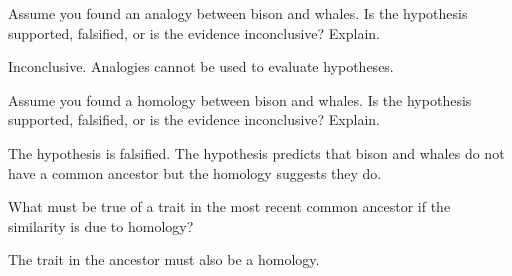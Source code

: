\documentclass[12pt, addpoints, hidelinks]{exam}
\newcommand*\AnswerBox[2]{%
    \parbox[t][#1]{0.92\textwidth}{%
    \begin{solution}#2\end{solution}}
}
\begin{document}
\begin{questions}
\question[1]
Assume you found an analogy between bison and whales. Is the hypothesis supported, falsified, or is the evidence inconclusive? Explain.

\AnswerBox{4\baselineskip}{Inconclusive. Analogies cannot be used to evaluate hypotheses.}

\question[1]
Assume you found a homology between bison and whales. Is the hypothesis supported, falsified, or is the evidence inconclusive? Explain.

\AnswerBox{4\baselineskip}{The hypothesis is falsified. The hypothesis predicts that bison and whales do not have a common ancestor but the homology suggests they do.}

\question[1]
What must be true of a trait in the most recent common ancestor if the
similarity is due to homology?

\AnswerBox{2\baselineskip}{The trait in the ancestor must also be a homology.}


\end{questions}
\end{document}
